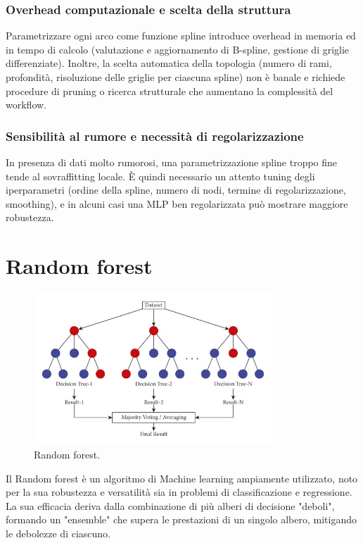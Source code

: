\documentclass[a4paper,12pt]{report}
\begin{document}
	\subsection{Overhead computazionale e scelta della struttura}
	Parametrizzare ogni arco come funzione spline introduce overhead in memoria ed in tempo di calcolo (valutazione e aggiornamento di B-spline, gestione di griglie differenziate). Inoltre, la scelta automatica della topologia (numero di rami, profondità, risoluzione delle griglie per ciascuna spline) non è banale e richiede procedure di pruning o ricerca strutturale che aumentano la complessità del workflow.
	
	\subsection{Sensibilità al rumore e necessità di regolarizzazione}
	In presenza di dati molto rumorosi, una parametrizzazione spline troppo fine tende al sovraffitting locale. È quindi necessario un attento tuning degli iperparametri (ordine della spline, numero di nodi, termine di regolarizzazione, smoothing), e in alcuni casi una MLP ben regolarizzata può mostrare maggiore robustezza.
	
	\chapter{Random forest}
	
	\begin{figure}[H]
		\centering
		\includegraphics[width=0.8\textwidth]{img/rf.png}
		\caption{Random forest.}
	\end{figure}
	
	Il Random forest è un algoritmo di Machine learning ampiamente utilizzato, noto per la sua robustezza e versatilità sia in problemi di classificazione e regressione. La sua efficacia deriva dalla combinazione di più alberi di decisione "deboli", formando un "ensemble" che supera le prestazioni di un singolo albero, mitigando le debolezze di ciascuno.
	
\end{document}
